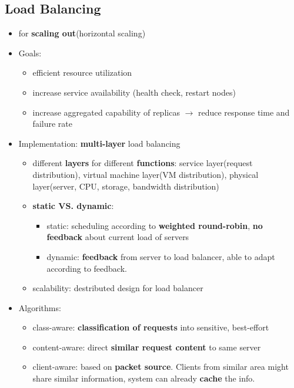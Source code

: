 \subsection{Load Balancing}
\begin{itemize}
	\item for \textbf{scaling out}(horizontal scaling)
	\item Goals:
	\begin{itemize}
		\item efficient resource utilization
		\item increase service availability (health check, restart nodes)
		\item increase aggregated capability of replicas $\rightarrow$ reduce response time and failure rate
	\end{itemize}
	\item Implementation: \textbf{multi-layer} load balancing
	\begin{itemize}
		\item different \textbf{layers} for different \textbf{functions}: service layer(request distribution), virtual machine layer(VM distribution), physical layer(server, CPU, storage, bandwidth distribution)
		\item \textbf{static VS. dynamic}: 
		\begin{itemize}
			\item static: scheduling according to \textbf{weighted round-robin}, \textbf{no feedback} about current load of servers
			\item dynamic: \textbf{feedback} from server to load balancer, able to adapt according to feedback.
		\end{itemize} 
		\item scalability: destributed design for load balancer
	\end{itemize}
	\item Algorithms:
	\begin{itemize}
		\item class-aware: \textbf{classification of requests} into sensitive, best-effort
		\item content-aware: direct \textbf{similar request content} to same server
		\item client-aware: based on \textbf{packet source}. Clients from similar area might share similar information, system can already \textbf{cache} the info.
	\end{itemize}
\end{itemize}

